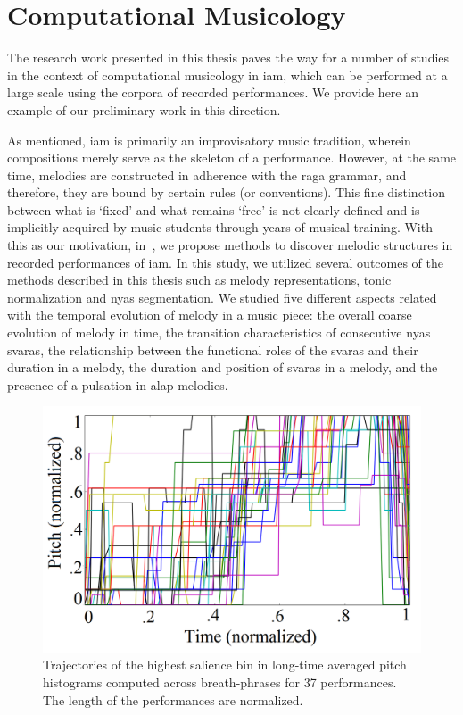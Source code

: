 \section{Computational Musicology}

The research work presented in this thesis paves the way for a number of studies in the context of computational musicology in \gls{iam}, which can be performed at a large scale using the corpora of recorded performances. We provide here an example of our preliminary work in this direction. 

As mentioned, \gls{iam} is primarily an improvisatory music tradition, wherein compositions merely serve as the skeleton of a performance. However, at the same time, melodies are constructed in adherence with the \gls{raga} grammar, and therefore, they are bound by certain rules (or conventions). This fine distinction between what is `fixed' and what remains `free' is not clearly defined and is implicitly acquired by music students through years of musical training. With this as our motivation, in~\cite{kaustuv_ismir_2016}, we propose methods to discover melodic structures in recorded performances of \gls{iam}. In this study, we utilized several outcomes of the methods described in this thesis such as melody representations, tonic normalization and \gls{nyas} segmentation. We studied five different aspects related with the temporal evolution of melody in a music piece: the overall coarse evolution of melody in time, the transition characteristics of consecutive \gls{nyas} \glspl{svara}, the relationship between the functional roles of the \glspl{svara} and their duration in a melody, the duration and position of \glspl{svara} in a melody, and the presence of a pulsation in \gls{alap} melodies. 

\begin{figure}
	\begin{center}
		\includegraphics[width=\figSizeSeventy]{ch08_applications/figures/Fig-5.png}
	\end{center}
	\caption[Trajectories of the highest salience bin in long-time averaged pitch histograms computed across breath-phrases]{Trajectories of the highest salience bin in long-time averaged pitch histograms computed across breath-phrases for 37 performances. The length of the performances are normalized.}
	\label{fig:temporal_evolution}
\end{figure}

